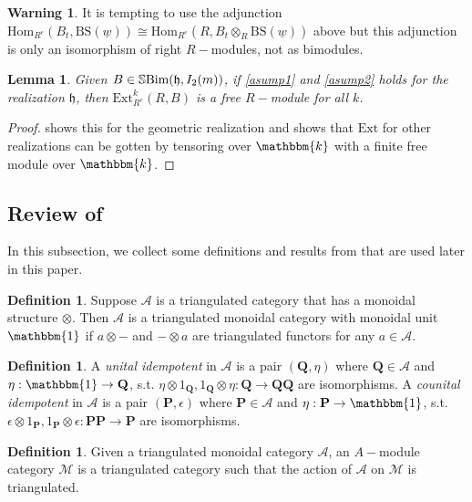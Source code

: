 \documentclass[10pt]{article}
\numberwithin{theorem}{section}
\newtheorem{lemma}[theorem]{Lemma}
\theoremstyle{definition}
\newtheorem{definition}[theorem]{Definition}
\newtheorem*{warn}{Warning}
\newcommand{\ext}{\mathrm{Ext}}
\newcommand{\bs}{\mathrm{BS}}
\newcommand{\kb}{\mathbbm{k}}
\renewcommand{\hom}{\mathrm{Hom}}
\newcommand{\Ac}{\mathcal{A}}
\newcommand{\Mc}{\mathcal{M}}
\newcommand{\hf}{\mathfrak{h}}
\newcommand{\sbim}{\mathbb{S}\textnormal{Bim}}
\newcommand{\un}[1]{\underline{#1}}
\newcommand{\0}{\ \raisebox{-2ex}{\begin{tikzpicture}[xscale=0.25,yscale=0.3,thick,baseline]
 \draw (0,0) -- (0,3); 
\end{tikzpicture}}}
\renewcommand{\1}{\ \raisebox{-2ex}{\begin{tikzpicture}[xscale=0.25,yscale=0.3,thick,baseline]
 \draw (0,0) -- (0,1);
 \draw (0,2) -- (0,3);
 \node[dot] at (0,1) {};
  \node[dot] at (0,2) {};
\end{tikzpicture}}}
\begin{document}
\begin{warn}
 It is tempting to use the adjunction $\hom_{R^e}(B_t, \bs(\un{w}))\cong \hom_{R^e}(R,B_t\otimes_R \bs(\un{w})) $ above but this adjunction is only an isomorphism of right $R-$modules, not as bimodules.  
\end{warn}

\begin{lemma}
\label{li36}
  Given $B\in \sbim(\hf  ,I_2(m))$, if \cref{asump1} and \cref{asump2} holds for the realization $\hf$, then  $\ext^{k}_{R^e}(R, B)$ is a free $R-$module for all $k$. 
\end{lemma}
\begin{proof}
    \cite[Theorem 7.12]{Li25} shows this for the geometric realization and \cite[Theorem 3.6]{Li25} shows that $\ext$ for other realizations can be gotten by tensoring over $\kb$ with a finite free module over $\kb$. 
\end{proof}




\subsection{Review of \cite{GHMN19}}

In this subsection, we collect some definitions and results from \cite{GHMN19} that are used later in this paper. 

\begin{definition}
Suppose $\Ac$ is a triangulated category that has a monoidal structure $\otimes$. Then $\Ac$ is a triangulated monoidal category with monoidal unit $\mathbbm{1}$ if $a\otimes -$ and $-\otimes a$ are triangulated functors for any $a\in \Ac$. 
\end{definition}

\begin{definition}
A \textit{unital idempotent} in $\Ac$ is a pair $(\mathbf{Q}, \eta)$ where $\mathbf{Q}\in \Ac$ and $\eta: \mathbbm{1}\to \mathbf{Q}$, s.t. $\eta \otimes 1_{\mathbf{Q} }, 1_{\mathbf{Q}}\otimes \eta: \mathbf{Q}\to \mathbf{Q}\mathbf{Q}$ are isomorphisms. A \textit{counital idempotent} in $\Ac$ is a pair $(\mathbf{P}, \epsilon)$ where $\mathbf{P}\in \Ac$ and $\eta:\mathbf{P}\to \mathbbm{1}$, s.t. $\epsilon \otimes 1_{\mathbf{P} }, 1_{\mathbf{P}}\otimes \epsilon: \mathbf{P} \mathbf{P}\to \mathbf{P}$ are isomorphisms.
\end{definition}

\begin{definition}
Given a triangulated monoidal category $\Ac$, an $A-$module category $\Mc$ is a triangulated category such that the action of $\Ac$ on $\Mc$ is triangulated.
\end{definition}
\end{document}
